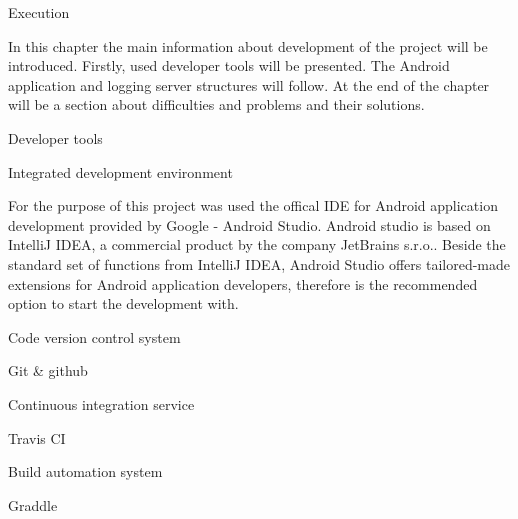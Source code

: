 

\chap Execution

In this chapter the main information about development of the project will be introduced. Firstly, used developer tools will be presented. The Android application and logging server structures will follow. At the end of the chapter will be a section about difficulties and problems and their solutions. 

\sec Developer tools



\secc Integrated development environment

For the purpose of this project was used the offical IDE for Android application development provided by Google - Android Studio. Android studio is based on IntelliJ IDEA, a commercial product
by the company JetBrains s.r.o.. Beside the standard set of functions from IntelliJ IDEA, Android Studio offers tailored-made extensions for Android application developers, therefore is the recommended option to start the development with.

\secc Code version control system

Git \& github

\secc Continuous integration service

Travis CI

\secc Build automation system

Graddle

